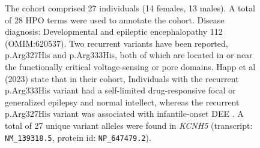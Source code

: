 \begin{figure}[htbp]
\vspace{2em}

\caption{ The cohort comprised 27 individuals (14 females, 13 males). A total of 28 HPO terms were used to annotate the cohort. Disease diagnosis: Developmental and epileptic encephalopathy 112 (OMIM:620537). Two recurrent variants have been reported, p.Arg327His and p.Arg333His, both of which are located in or near the functionally critical 
voltage-sensing or pore domains. Happ et al (2023) state that in their cohort, Individuals with the recurrent p.Arg333His variant had a self-limited 
drug-responsive focal or generalized epilepsy and normal intellect, whereas the recurrent p.Arg327His variant was associated with infantile-onset DEE \cite{PMID_36307226}. 
A total of 27 unique variant alleles were found in \textit{KCNH5} (transcript: \texttt{NM\_139318.5}, protein id: \texttt{NP\_647479.2}).}
\end{figure}
